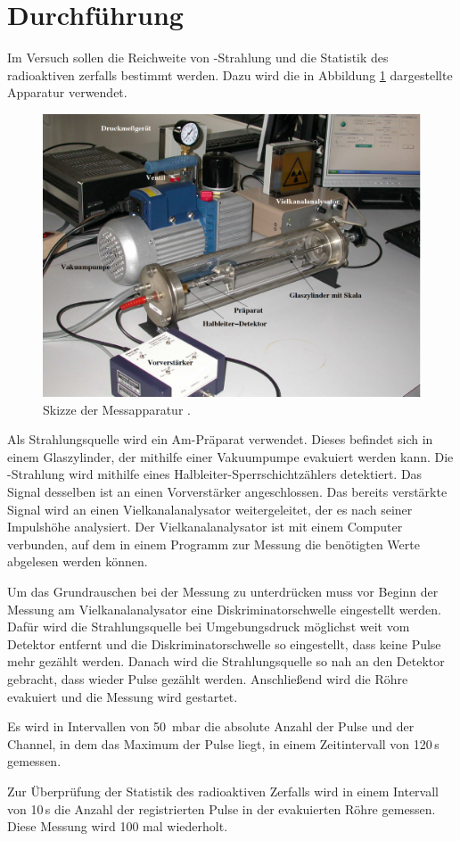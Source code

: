 \section{Durchführung}
\label{sec:Durchführung}
Im Versuch sollen die Reichweite von \alpha-Strahlung und die Statistik des
radioaktiven zerfalls bestimmt werden. Dazu wird die in Abbildung \ref{fig:geraet}
dargestellte Apparatur verwendet.

\begin{figure}[H]
  \centering
  \includegraphics[width=\textwidth]{data/aufbau.png}
  \caption{Skizze der Messapparatur \cite{Versuchsanleitung}.}
  \label{fig:geraet}
\end{figure}

Als Strahlungsquelle wird ein Am-Präparat verwendet. Dieses befindet sich in einem
Glaszylinder, der mithilfe einer Vakuumpumpe evakuiert werden kann. Die \alpha-Strahlung
wird mithilfe eines Halbleiter-Sperrschichtzählers detektiert. Das Signal desselben ist
an einen Vorverstärker angeschlossen. Das bereits verstärkte Signal wird an einen
Vielkanalanalysator weitergeleitet, der es nach seiner Impulshöhe analysiert. Der
Vielkanalanalysator ist mit einem Computer verbunden, auf dem in einem Programm zur
Messung die benötigten Werte abgelesen werden können.

Um das Grundrauschen bei der Messung zu unterdrücken muss vor Beginn der Messung
am Vielkanalanalysator eine Diskriminatorschwelle eingestellt werden. Dafür wird
die Strahlungsquelle bei Umgebungsdruck möglichst weit vom Detektor entfernt und
die Diskriminatorschwelle so eingestellt, dass keine Pulse mehr gezählt werden.
Danach wird die Strahlungsquelle so nah an den Detektor gebracht, dass wieder
Pulse gezählt werden. Anschließend wird die Röhre evakuiert und die Messung wird gestartet.

Es wird in Intervallen von 50\, mbar die absolute Anzahl der Pulse und der Channel,
in dem das Maximum der Pulse liegt, in einem Zeitintervall von 120\,s gemessen.

Zur Überprüfung der Statistik des radioaktiven Zerfalls wird in einem Intervall
von 10\,s die Anzahl der registrierten Pulse in der evakuierten Röhre gemessen. Diese
Messung wird 100 mal wiederholt.
